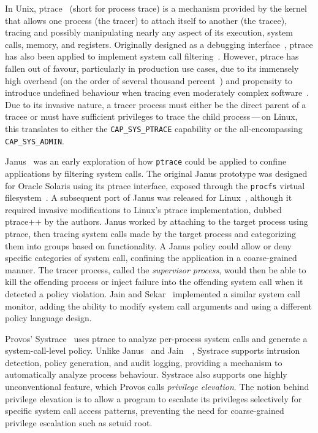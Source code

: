In Unix, ptrace~\cite{ptrace, padala2002_ptrace} (short for process trace) is a mechanism
provided by the kernel that allows one process (the tracer) to attach itself to another
(the tracee), tracing and possibly manipulating nearly any aspect of its execution, system
calls, memory, and registers. Originally designed as a debugging interface~\cite{ptrace,
padala2002_ptrace}, ptrace has also been applied to implement system call
filtering~\cite{goldberg96_janus, wagner1999_janus, jain2000_filtering}. However, ptrace
has fallen out of favour, particularly in production use cases, due to its immensely high
overhead (on the order of several thousand percent~\cite{zinke2009_overhead}) and
propensity to introduce undefined behaviour when tracing even moderately complex
software~\cite{swiecki2017_promises}. Due to its invasive nature, a tracer process must
either be the direct parent of a tracee or must have sufficient privileges to trace the
child process\,---\,on Linux, this translates to either the \texttt{CAP\_SYS\_PTRACE}
capability or the all-encompassing \texttt{CAP\_SYS\_ADMIN}.

Janus~\cite{goldberg96_janus, wagner1999_janus} was an early exploration of how
\texttt{ptrace} could be applied to confine applications by filtering system calls.  The
original Janus prototype was designed for Oracle Solaris using its ptrace interface,
exposed through the \texttt{procfs} virtual filesystem~\cite{goldberg96_janus}.
A subsequent port of Janus was released for Linux~\cite{wagner1999_janus}, although it
required invasive modifications to Linux's ptrace implementation, dubbed ptrace++ by the
authors. Janus worked by attaching to the target process using ptrace, then tracing system
calls made by the target process and categorizing them into groups based on functionality.
A Janus policy could allow or deny specific categories of system call, confining the
application in a coarse-grained manner. The tracer process, called the \textit{supervisor
process}, would then be able to kill the offending process or inject failure into the
offending system call when it detected a policy violation.  Jain and
Sekar~\cite{jain2000_filtering} implemented a similar system call monitor, adding the
ability to modify system call arguments and using a different policy language design.

Provos' Systrace~\cite{provos2003_systrace} uses ptrace to analyze per-process system
calls and generate a system-call-level policy. Unlike Janus~\cite{goldberg96_janus,
wagner1999_janus} and Jain~\etal~\cite{jain2000_filtering}, Systrace supports intrusion
detection, policy generation, and audit logging, providing a mechanism to automatically
analyze process behaviour. Systrace also supports one highly unconventional feature, which
Provos calls \textit{privilege elevation}. The notion behind privilege elevation is to
allow a program to escalate its privileges selectively for specific system call access
patterns, preventing the need for coarse-grained privilege escalation such as setuid root.

